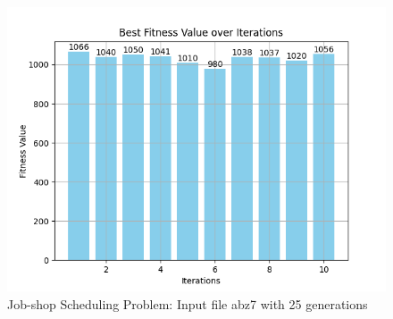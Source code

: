 \documentclass[12pt]{article}
\begin{document}
\newpage

\begin{figure}[h]
    \centering
    \includegraphics[width=1\textwidth]{images/JSSP_rntrbestscorelessgensABZ7.png}
    \caption{Job-shop Scheduling Problem: Input file abz7 with 25 generations}
\end{figure}

\newpage
\end{document}
